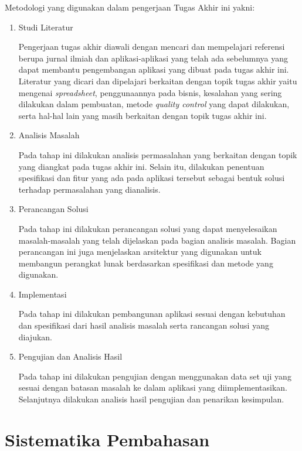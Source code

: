 Metodologi yang digunakan dalam pengerjaan Tugas Akhir ini yakni:
\begin{enumerate}
    \item Studi Literatur

    Pengerjaan tugas akhir diawali dengan mencari dan mempelajari referensi berupa jurnal ilmiah dan aplikasi-aplikasi yang telah ada sebelumnya yang dapat membantu pengembangan aplikasi yang dibuat pada tugas akhir ini. Literatur yang dicari dan dipelajari berkaitan dengan topik tugas akhir yaitu mengenai \textit{spreadsheet}, penggunaannya pada bisnis, kesalahan yang sering dilakukan dalam pembuatan, metode \textit{quality control} yang dapat dilakukan, serta hal-hal lain yang masih berkaitan dengan topik tugas akhir ini. 
    
    \item Analisis Masalah

    Pada tahap ini dilakukan analisis permasalahan yang berkaitan dengan topik yang diangkat pada tugas akhir ini. Selain itu, dilakukan penentuan spesifikasi dan fitur yang ada pada aplikasi tersebut sebagai bentuk solusi terhadap permasalahan yang dianalisis.

    \item Perancangan Solusi

    Pada tahap ini dilakukan perancangan solusi yang dapat menyelesaikan masalah-masalah yang telah dijelaskan pada bagian analisis masalah. Bagian perancangan ini juga menjelaskan arsitektur yang digunakan untuk membangun perangkat lunak berdasarkan spesifikasi dan metode yang digunakan.

    \item Implementasi

    Pada tahap ini dilakukan pembangunan aplikasi sesuai dengan kebutuhan dan spesifikasi dari hasil analisis masalah serta rancangan solusi yang diajukan.

    \item Pengujian dan Analisis Hasil

    Pada tahap ini dilakukan pengujian dengan menggunakan data set uji yang sesuai dengan batasan masalah ke dalam aplikasi yang diimplementasikan. Selanjutnya dilakukan analisis hasil pengujian dan penarikan kesimpulan.

\end{enumerate}

\section{Sistematika Pembahasan}

